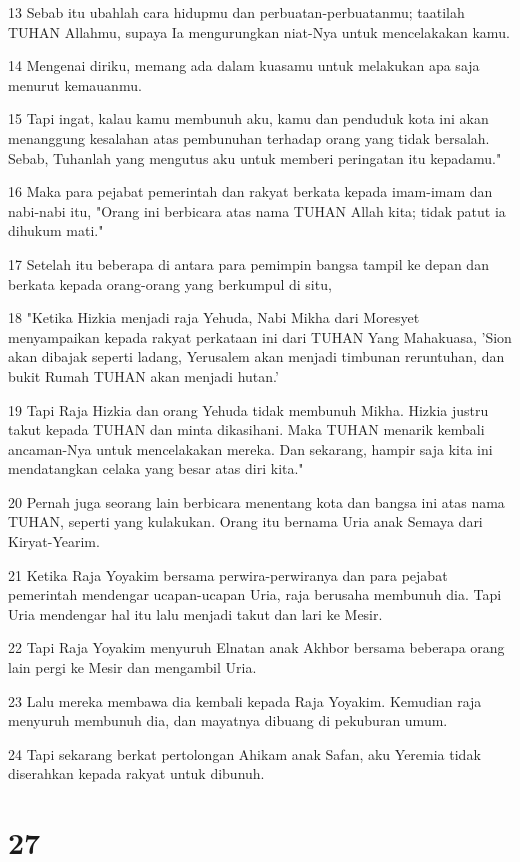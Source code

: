 \par 13 Sebab itu ubahlah cara hidupmu dan perbuatan-perbuatanmu; taatilah TUHAN Allahmu, supaya Ia mengurungkan niat-Nya untuk mencelakakan kamu.
\par 14 Mengenai diriku, memang ada dalam kuasamu untuk melakukan apa saja menurut kemauanmu.
\par 15 Tapi ingat, kalau kamu membunuh aku, kamu dan penduduk kota ini akan menanggung kesalahan atas pembunuhan terhadap orang yang tidak bersalah. Sebab, Tuhanlah yang mengutus aku untuk memberi peringatan itu kepadamu."
\par 16 Maka para pejabat pemerintah dan rakyat berkata kepada imam-imam dan nabi-nabi itu, "Orang ini berbicara atas nama TUHAN Allah kita; tidak patut ia dihukum mati."
\par 17 Setelah itu beberapa di antara para pemimpin bangsa tampil ke depan dan berkata kepada orang-orang yang berkumpul di situ,
\par 18 "Ketika Hizkia menjadi raja Yehuda, Nabi Mikha dari Moresyet menyampaikan kepada rakyat perkataan ini dari TUHAN Yang Mahakuasa, 'Sion akan dibajak seperti ladang, Yerusalem akan menjadi timbunan reruntuhan, dan bukit Rumah TUHAN akan menjadi hutan.'
\par 19 Tapi Raja Hizkia dan orang Yehuda tidak membunuh Mikha. Hizkia justru takut kepada TUHAN dan minta dikasihani. Maka TUHAN menarik kembali ancaman-Nya untuk mencelakakan mereka. Dan sekarang, hampir saja kita ini mendatangkan celaka yang besar atas diri kita."
\par 20 Pernah juga seorang lain berbicara menentang kota dan bangsa ini atas nama TUHAN, seperti yang kulakukan. Orang itu bernama Uria anak Semaya dari Kiryat-Yearim.
\par 21 Ketika Raja Yoyakim bersama perwira-perwiranya dan para pejabat pemerintah mendengar ucapan-ucapan Uria, raja berusaha membunuh dia. Tapi Uria mendengar hal itu lalu menjadi takut dan lari ke Mesir.
\par 22 Tapi Raja Yoyakim menyuruh Elnatan anak Akhbor bersama beberapa orang lain pergi ke Mesir dan mengambil Uria.
\par 23 Lalu mereka membawa dia kembali kepada Raja Yoyakim. Kemudian raja menyuruh membunuh dia, dan mayatnya dibuang di pekuburan umum.
\par 24 Tapi sekarang berkat pertolongan Ahikam anak Safan, aku Yeremia tidak diserahkan kepada rakyat untuk dibunuh.

\chapter{27}

